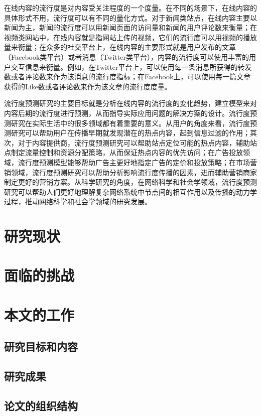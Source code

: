 在线内容的流行度是对内容受关注程度的一个度量。在不同的场景下，在线内容的具体形式不用，流行度可以有不同的量化方式。对于新闻类站点，在线内容主要以新闻为主，新闻的流行度可以用新闻页面的访问量和新闻的用户评论数来衡量；在视频类网站中，在线内容就是指网站上传的视频，它们的流行度可以用视频的播放量来衡量；在众多的社交平台上，在线内容的主要形式就是用户发布的文章（Facebook类平台）或者消息（Twitter类平台），内容的流行度可以使用丰富的用户交互信息来衡量。例如，在Twitter平台上，可以使用每一条消息所获得的转发数或者评论数来作为该消息的流行度指标；在Facebook上，可以使用每一篇文章获得的Like数或者评论数来作为该文章的流行度度量。

流行度预测研究的主要目标就是分析在线内容的流行度的变化趋势，建立模型来对内容后期的流行度进行预测，从而指导实际应用问题的解决方案的设计。流行度预测研究在实际生活中的很多领域都有着重要的意义。从用户的角度来看，流行度预测研究可以帮助用户在传播早期就发现潜在的热点内容\citep{tatar2014popularity,tatar2012ranking}，起到信息过滤的作用；其次，对于内容提供商，流行度预测研究可以帮助站点定位可能的热点内容，辅助站点制定流量控制和资源分配策略\citep{chen2003popularity,famaey2013towards}，从而保证热点内容的优先访问；在广告投放领域，流行度预测模型能够帮助广告主更好地指定广告的定价和投放策略；在市场营销领域，流行度预测研究可以帮助分析影响流行度传播的因素，进而辅助营销商家制定更好的营销方案。从科学研究的角度，在网络科学和社会学领域，流行度预测研究可以帮助人们更好地理解复杂网络系统中节点间的相互作用以及传播的动力学过程，推动网络科学和社会学领域的研究发展。

\section{研究现状}

\section{面临的挑战}
\section{本文的工作}
\subsection{研究目标和内容}
\subsection{研究成果}
\subsection{论文的组织结构}
